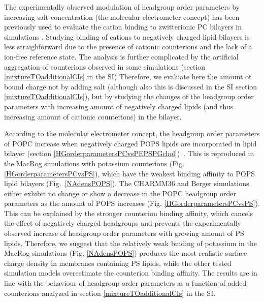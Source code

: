 \documentclass[aps,prl,superscriptaddress,twocolumn]{revtex4}
\begin{document}
The experimentally observed modulation of headgroup order parameters
by increasing salt concentration (the molecular electrometer concept) has been previously used to evaluate the cation binding to zwitterionic PC bilayers in simulations \cite{catte16}.
Studying binding of cations to negatively charged lipid bilayers is less straighforward due to the presence of cationic counterions and the lack of a ion-free reference state.
The analysis is further complicated by the artificial aggregation of counterions
observed in some simulations (section \ref{mixtureTOadditionalCIs} in the SI)
Therefore, we evaluate here the amount of bound charge not by adding salt
(although also this is discussed in the SI section \ref{mixtureTOadditionalCIs}),
but by studying the changes of the headgroup order parameters with increasing amount of
negatively charged lipids (and thus increasing amount of cationic counterions) in the bilayer.

According to the molecular electrometer concept, the headgroup order parameters of POPC
increase when negatively charged POPS lipids are incorporated in lipid bilayer
(section \ref{HGorderparametersPCvsPEPSPGchol})~\cite{seelig87,scherer87}.
This is reproduced in the MacRog simulations with potassium counterions (Fig. \ref{HGorderparametersPCvsPS}),
which have the weakest binding affinity to POPS lipid bilayers (Fig.~\ref{NAdensPOPS}).
The CHARMM36 and Berger simulations either exhibit no change or show a decrease
in the POPC headgroup order parameters as the amount of POPS increases (Fig. \ref{HGorderparametersPCvsPS}).
This can be explained by the stronger counterion binding affinity, which cancels
the effect of negatively charged headgroups and prevents the experimentally observed
increase of headgroup order parameters with growing amount of PS lipids.
Therefore, we suggest that the relatively weak binding of potassium
in the MacRog simulations (Fig. \ref{NAdensPOPS}) produces the most
realistic surface charge density in membranes containing PS lipids,
while the other tested simulation models overestimate the counterion
binding affinity. The results are in line with the behaviour of headgroup order
parameters as a function of added counterions analyzed in section \ref{mixtureTOadditionalCIs}
in the SI.
\end{document}
